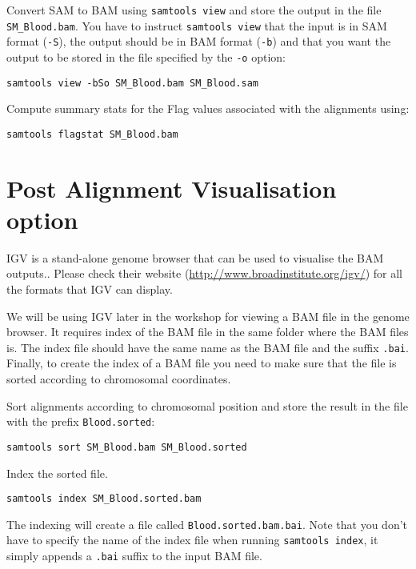 \begin{steps}
Convert SAM to BAM using \texttt{samtools view} and store the output in the file
\texttt{SM\_Blood.bam}. You have to instruct \texttt{samtools view} that the input is in SAM
format (\texttt{-S}), the output should be in BAM format (\texttt{-b}) and that
you want the output to be stored in the file specified by the \texttt{-o}
option:

\begin{lstlisting}
samtools view -bSo SM_Blood.bam SM_Blood.sam
\end{lstlisting}
\end{steps}

\begin{advanced}
Compute summary stats for the Flag values associated with the alignments using:

\begin{lstlisting}
samtools flagstat SM_Blood.bam
\end{lstlisting}
\end{advanced}

\section{Post Alignment Visualisation option}

\begin{information}
IGV is a stand-alone genome browser that can be used to visualise the BAM outputs.. Please check their website
(\url{http://www.broadinstitute.org/igv/}) for all the formats that IGV can display.
 
We will be using IGV later in the workshop for viewing a BAM file in the genome browser. It requires 
index of the BAM file in the same folder where the BAM files is. The index file
should have the same name as the BAM file and the suffix \texttt{.bai}. Finally, to
create the index of a BAM file you need to make sure that the file is sorted
according to chromosomal coordinates.
\begin{note}
\end{note}

\end{information}


\begin{steps}
Sort alignments according to chromosomal position and store the result in the
file with the prefix \texttt{Blood.sorted}:

\begin{lstlisting}
samtools sort SM_Blood.bam SM_Blood.sorted
\end{lstlisting}

Index the sorted file.

\begin{lstlisting}
samtools index SM_Blood.sorted.bam
\end{lstlisting}

The indexing will create a file called \texttt{Blood.sorted.bam.bai}. Note that
you don't have to specify the name of the index file when running
\texttt{samtools index}, it simply appends a \texttt{.bai} suffix to the input
BAM file.
\end{steps}


